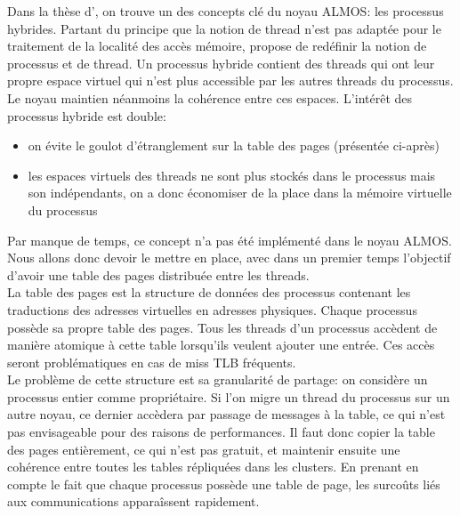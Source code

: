       Dans la thèse d'\citet{almaless2014universite}, on trouve un des concepts
      clé du noyau ALMOS: les processus hybrides. Partant du principe que la
      notion de thread n'est pas adaptée pour le traitement de la localité des
      accès mémoire,\citeauthor{almaless2014universite} propose de redéfinir la
      notion de processus et de thread. Un processus hybride contient des
      threads qui ont leur propre espace virtuel qui n'est plus accessible par
      les autres threads du processus. Le noyau maintien néanmoins la cohérence
      entre ces espaces. L'intérêt des processus hybride est double:
      \begin{itemize}
        \item on évite le goulot d'étranglement sur la table des pages
          (présentée ci-après)
        \item les espaces virtuels des threads ne sont plus stockés dans le
          processus mais son indépendants, on a donc économiser de la place dans
          la mémoire virtuelle du processus
      \end{itemize}

      Par manque de temps, ce concept n'a pas été implémenté dans le noyau
      ALMOS. Nous allons donc devoir le mettre en place, avec dans un premier
      temps l'objectif d'avoir une table des pages distribuée entre les
      threads.\\

      La table des pages est la structure de données des processus contenant les
      traductions des adresses virtuelles en adresses physiques. Chaque
      processus possède sa propre table des pages. Tous les threads d'un
      processus accèdent de manière atomique à cette table lorsqu'ils veulent
      ajouter une entrée. Ces accès seront problématiques en cas de miss TLB
      fréquents.\\

      Le problème de cette structure est sa granularité de partage: on considère
      un processus entier comme propriétaire. Si l'on migre un thread du
      processus sur un autre noyau, ce dernier accèdera par passage de messages
      à la table, ce qui n'est pas envisageable pour des raisons de
      performances. Il faut donc copier la table des pages entièrement, ce qui
      n'est pas gratuit, et maintenir ensuite une cohérence entre toutes les
      tables répliquées dans les clusters. En prenant en compte le fait que
      chaque processus possède une table de page, les surcoûts liés aux
      communications apparaîssent rapidement.

